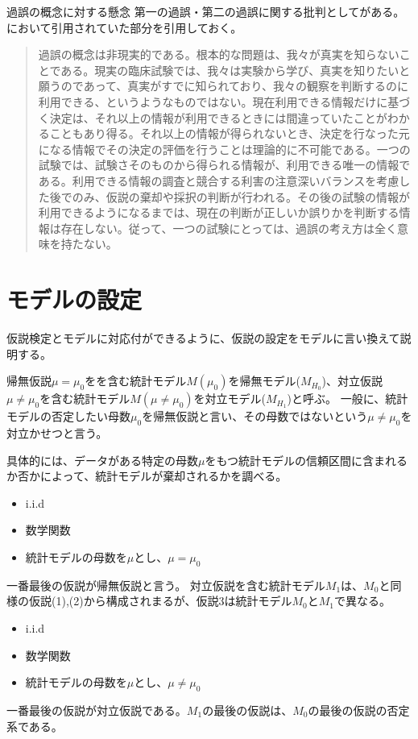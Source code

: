 \begin{SMbox}{過誤の概念に対する懸念}
第一の過誤・第二の過誤に関する批判として\cite{norleans2004臨床試験のための統計的方法}がある。
\cite{2010毒性試験に用いる統計解析法の動向}において引用されていた部分を引用しておく。
\begin{quote}
過誤の概念は非現実的である。根本的な問題は、我々が真実を知らないことである。現実の臨床試験では、我々は実験から学び、真実を知りたいと願うのであって、真実がすでに知られており、我々の観察を判断するのに利用できる、というようなものではない。現在利用できる情報だけに基づく決定は、それ以上の情報が利用できるときには間違っていたことがわかることもあり得る。それ以上の情報が得られないとき、決定を行なった元になる情報でその決定の評価を行うことは理論的に不可能である。一つの試験では、試験さそのものから得られる情報が、利用できる唯一の情報である。利用できる情報の調査と競合する利害の注意深いバランスを考慮した後でのみ、仮説の棄却や採択の判断が行われる。その後の試験の情報が利用できるようになるまでは、現在の判断が正しいか誤りかを判断する情報は存在しない。従って、一つの試験にとっては、過誤の考え方は全く意味を持たない。
\end{quote}
\end{SMbox}




\section{モデルの設定}
仮説検定とモデルに対応付ができるように、仮説の設定をモデルに言い換えて説明する。

帰無仮説$\mu=\mu_0$をを含む統計モデル$M(\mu_0)$を帰無モデル($M_{H_0}$)、対立仮説$\mu\neq \mu_0$を含む統計モデル$M(\mu\neq\mu_0)$を対立モデル($M_{H_1}$)と呼ぶ。
一般に、統計モデルの否定したい母数$\mu_0$を帰無仮説と言い、その母数ではないという$\mu\neq\mu_0$を対立かせつと言う。

具体的には、データがある特定の母数$\mu$をもつ統計モデルの信頼区間に含まれるか否かによって、統計モデルが棄却されるかを調べる。
\begin{itemize}
    \item i.i.d
    \item 数学関数
    \item 統計モデルの母数を$\mu$とし、$\mu=\mu_0$
\end{itemize}
一番最後の仮説が帰無仮説と言う。
対立仮説を含む統計モデル$M_1$は、$M_0$と同様の仮説(1),(2)から構成されまるが、仮説3は統計モデル$M_0$と$M_1$で異なる。
\begin{itemize}
    \item i.i.d
    \item 数学関数
    \item 統計モデルの母数を$\mu$とし、$\mu\neq\mu_0$
\end{itemize}
一番最後の仮説が対立仮説である。$M_1$の最後の仮説は、$M_0$の最後の仮説の否定系である。

